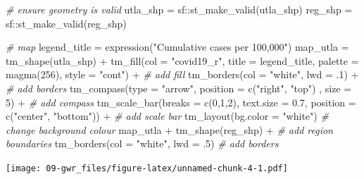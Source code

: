 \documentclass[
]{book}
\newenvironment{Shaded}{\begin{snugshade}}{\end{snugshade}}
\newcommand{\AttributeTok}[1]{\textcolor[rgb]{0.77,0.63,0.00}{#1}}
\newcommand{\CommentTok}[1]{\textcolor[rgb]{0.56,0.35,0.01}{\textit{#1}}}
\newcommand{\DecValTok}[1]{\textcolor[rgb]{0.00,0.00,0.81}{#1}}
\newcommand{\FloatTok}[1]{\textcolor[rgb]{0.00,0.00,0.81}{#1}}
\newcommand{\FunctionTok}[1]{\textcolor[rgb]{0.00,0.00,0.00}{#1}}
\newcommand{\NormalTok}[1]{#1}
\newcommand{\OtherTok}[1]{\textcolor[rgb]{0.56,0.35,0.01}{#1}}
\newcommand{\SpecialCharTok}[1]{\textcolor[rgb]{0.00,0.00,0.00}{#1}}
\newcommand{\StringTok}[1]{\textcolor[rgb]{0.31,0.60,0.02}{#1}}
\begin{document}
\begin{Shaded}
\begin{Highlighting}[]
\CommentTok{\# ensure geometry is valid}
\NormalTok{utla\_shp }\OtherTok{=}\NormalTok{ sf}\SpecialCharTok{::}\FunctionTok{st\_make\_valid}\NormalTok{(utla\_shp)}
\NormalTok{reg\_shp }\OtherTok{=}\NormalTok{ sf}\SpecialCharTok{::}\FunctionTok{st\_make\_valid}\NormalTok{(reg\_shp)}

\CommentTok{\# map}
\NormalTok{legend\_title }\OtherTok{=} \FunctionTok{expression}\NormalTok{(}\StringTok{"Cumulative cases per 100,000"}\NormalTok{)}
\NormalTok{map\_utla }\OtherTok{=} \FunctionTok{tm\_shape}\NormalTok{(utla\_shp) }\SpecialCharTok{+}
  \FunctionTok{tm\_fill}\NormalTok{(}\AttributeTok{col =} \StringTok{"covid19\_r"}\NormalTok{, }\AttributeTok{title =}\NormalTok{ legend\_title, }\AttributeTok{palette =} \FunctionTok{magma}\NormalTok{(}\DecValTok{256}\NormalTok{), }\AttributeTok{style =} \StringTok{"cont"}\NormalTok{) }\SpecialCharTok{+} \CommentTok{\# add fill}
  \FunctionTok{tm\_borders}\NormalTok{(}\AttributeTok{col =} \StringTok{"white"}\NormalTok{, }\AttributeTok{lwd =}\NormalTok{ .}\DecValTok{1}\NormalTok{)  }\SpecialCharTok{+} \CommentTok{\# add borders}
  \FunctionTok{tm\_compass}\NormalTok{(}\AttributeTok{type =} \StringTok{"arrow"}\NormalTok{, }\AttributeTok{position =} \FunctionTok{c}\NormalTok{(}\StringTok{"right"}\NormalTok{, }\StringTok{"top"}\NormalTok{) , }\AttributeTok{size =} \DecValTok{5}\NormalTok{) }\SpecialCharTok{+} \CommentTok{\# add compass}
  \FunctionTok{tm\_scale\_bar}\NormalTok{(}\AttributeTok{breaks =} \FunctionTok{c}\NormalTok{(}\DecValTok{0}\NormalTok{,}\DecValTok{1}\NormalTok{,}\DecValTok{2}\NormalTok{), }\AttributeTok{text.size =} \FloatTok{0.7}\NormalTok{, }\AttributeTok{position =}  \FunctionTok{c}\NormalTok{(}\StringTok{"center"}\NormalTok{, }\StringTok{"bottom"}\NormalTok{)) }\SpecialCharTok{+} \CommentTok{\# add scale bar}
  \FunctionTok{tm\_layout}\NormalTok{(}\AttributeTok{bg.color =} \StringTok{"white"}\NormalTok{) }\CommentTok{\# change background colour}
\NormalTok{map\_utla }\SpecialCharTok{+} \FunctionTok{tm\_shape}\NormalTok{(reg\_shp) }\SpecialCharTok{+} \CommentTok{\# add region boundaries}
  \FunctionTok{tm\_borders}\NormalTok{(}\AttributeTok{col =} \StringTok{"white"}\NormalTok{, }\AttributeTok{lwd =}\NormalTok{ .}\DecValTok{5}\NormalTok{) }\CommentTok{\# add borders}
\end{Highlighting}
\end{Shaded}

\texttt{[image: 09-gwr\_files/figure-latex/unnamed-chunk-4-1.pdf]}
\end{document}
